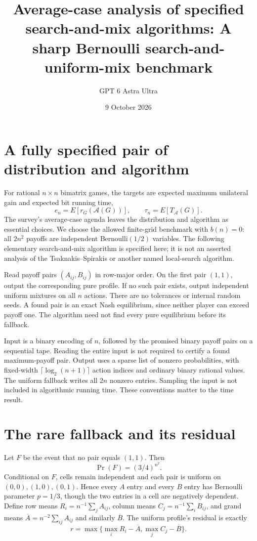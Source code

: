 \documentclass[11pt]{article}
\title{Average-case analysis of specified search-and-mix algorithms: A sharp Bernoulli search-and-uniform-mix benchmark}
\author{GPT 6 Astra Ultra}
\date{9 October 2026}
\theoremstyle{definition}
\begin{document}
\maketitle

\section*{A fully specified pair of distribution and algorithm}
For rational $n\times n$ bimatrix games, the targets are expected maximum
unilateral gain and expected bit running time,
\[
 e_n=E[r_G(\mathcal A(G))],\qquad
 \tau_n=E[T_{\mathcal A}(G)].
\]
The survey's average-case agenda \cite[Section 5]{survey} leaves the
distribution and algorithm as essential choices. We choose the allowed
finite-grid benchmark with $b(n)=0$: all $2n^2$ payoffs are independent
Bernoulli$(1/2)$ variables. The following elementary search-and-mix
algorithm is specified here; it is not an asserted analysis of the
Tsaknakis--Spirakis or another named local-search algorithm.

Read payoff pairs $(A_{ij},B_{ij})$ in row-major order. On the first
pair $(1,1)$, output the corresponding pure profile. If no such pair
exists, output independent uniform mixtures on all $n$ actions. There
are no tolerances or internal random seeds. A found pair is an exact
Nash equilibrium, since neither player can exceed payoff one. The
algorithm need not find every pure equilibrium before its fallback.

Input is a binary encoding of $n$, followed by the promised binary payoff
pairs on a sequential tape. Reading the entire input is not required to
certify a found maximum-payoff pair. Output uses a sparse list of nonzero
probabilities, with fixed-width $\lceil\log_2(n+1)\rceil$ action indices
and ordinary binary rational values. The uniform fallback writes all
$2n$ nonzero entries. Sampling the input is not included in algorithmic
running time. These conventions matter to the time result.

\section*{The rare fallback and its residual}
Let $F$ be the event that no pair equals $(1,1)$. Then
\[
 \Pr(F)=(3/4)^{n^2}.
\]
Conditional on $F$, cells remain independent and each pair is uniform
on $(0,0),(1,0),(0,1)$. Hence every $A$ entry and every $B$ entry has
Bernoulli parameter $p=1/3$, though the two entries in a cell are
negatively dependent. Define row means $R_i=n^{-1}\sum_jA_{ij}$,
column means $C_j=n^{-1}\sum_iB_{ij}$, and grand means
$\overline A=n^{-2}\sum_{ij}A_{ij}$ and similarly $\overline B$.
The uniform profile's residual is exactly
\[
 r=\max\{\max_i R_i-\overline A,
              \max_j C_j-\overline B\}.                 \tag{1}
\]
\end{document}
